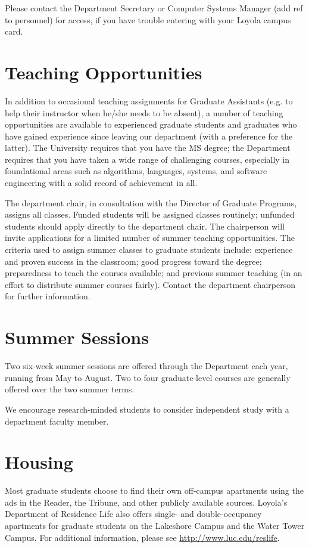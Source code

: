 \documentclass[letterpaper,10pt,english]{sphinxmanual}
\begin{document}
Please contact the Department Secretary or Computer Systems Manager (add ref to personnel) for access, if you have trouble entering with your Loyola campus card.


\section{Teaching Opportunities}
\label{general:teaching-opportunities}
In addition to occasional teaching assignments for Graduate Assistants (e.g. to help their instructor when he/she needs to be absent), a number of teaching opportunities are available to experienced graduate students and graduates who have gained experience since leaving our department (with a preference for the latter). The University requires that you have the MS degree; the Department requires that you have taken a wide range of challenging courses, especially in foundational areas such as algorithms, languages, systems, and software engineering with a solid record of achievement in all.

The department chair, in consultation with the Director of Graduate Programs, assigns all classes. Funded students will be assigned classes routinely; unfunded students should apply directly to the department chair. The chairperson will invite applications for a limited number of summer teaching opportunities. The criteria used to assign summer classes to graduate students include: experience and proven success in the classroom; good progress toward the degree; preparedness to teach the courses available; and previous summer teaching (in an effort to distribute summer courses fairly). Contact the department chairperson for further information.


\section{Summer Sessions}
\label{general:summer-sessions}
Two six-week summer sessions are offered through the Department each year, running from May to August. Two to four graduate-level courses are generally offered over the two summer terms.

We encourage research-minded students to consider independent study with a department faculty member.


\section{Housing}
\label{general:housing}
Most graduate students choose to find their own off-campus apartments using the ads in the Reader, the Tribune, and other publicly available sources. Loyola’s Department of Residence Life also offers single- and double-occupancy apartments for graduate students on the Lakeshore Campus and the Water Tower Campus. For additional information, please see \href{http://www.luc.edu/reslife}{http://www.luc.edu/reslife}.
\end{document}
